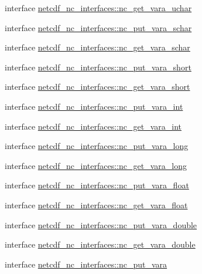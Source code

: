 \begin{DoxyCompactItemize}
\item 
interface \hyperlink{interfacenetcdf__nc__interfaces_1_1nc__get__vara__uchar}{netcdf\+\_\+nc\+\_\+interfaces\+::nc\+\_\+get\+\_\+vara\+\_\+uchar}
\item 
interface \hyperlink{interfacenetcdf__nc__interfaces_1_1nc__put__vara__schar}{netcdf\+\_\+nc\+\_\+interfaces\+::nc\+\_\+put\+\_\+vara\+\_\+schar}
\item 
interface \hyperlink{interfacenetcdf__nc__interfaces_1_1nc__get__vara__schar}{netcdf\+\_\+nc\+\_\+interfaces\+::nc\+\_\+get\+\_\+vara\+\_\+schar}
\item 
interface \hyperlink{interfacenetcdf__nc__interfaces_1_1nc__put__vara__short}{netcdf\+\_\+nc\+\_\+interfaces\+::nc\+\_\+put\+\_\+vara\+\_\+short}
\item 
interface \hyperlink{interfacenetcdf__nc__interfaces_1_1nc__get__vara__short}{netcdf\+\_\+nc\+\_\+interfaces\+::nc\+\_\+get\+\_\+vara\+\_\+short}
\item 
interface \hyperlink{interfacenetcdf__nc__interfaces_1_1nc__put__vara__int}{netcdf\+\_\+nc\+\_\+interfaces\+::nc\+\_\+put\+\_\+vara\+\_\+int}
\item 
interface \hyperlink{interfacenetcdf__nc__interfaces_1_1nc__get__vara__int}{netcdf\+\_\+nc\+\_\+interfaces\+::nc\+\_\+get\+\_\+vara\+\_\+int}
\item 
interface \hyperlink{interfacenetcdf__nc__interfaces_1_1nc__put__vara__long}{netcdf\+\_\+nc\+\_\+interfaces\+::nc\+\_\+put\+\_\+vara\+\_\+long}
\item 
interface \hyperlink{interfacenetcdf__nc__interfaces_1_1nc__get__vara__long}{netcdf\+\_\+nc\+\_\+interfaces\+::nc\+\_\+get\+\_\+vara\+\_\+long}
\item 
interface \hyperlink{interfacenetcdf__nc__interfaces_1_1nc__put__vara__float}{netcdf\+\_\+nc\+\_\+interfaces\+::nc\+\_\+put\+\_\+vara\+\_\+float}
\item 
interface \hyperlink{interfacenetcdf__nc__interfaces_1_1nc__get__vara__float}{netcdf\+\_\+nc\+\_\+interfaces\+::nc\+\_\+get\+\_\+vara\+\_\+float}
\item 
interface \hyperlink{interfacenetcdf__nc__interfaces_1_1nc__put__vara__double}{netcdf\+\_\+nc\+\_\+interfaces\+::nc\+\_\+put\+\_\+vara\+\_\+double}
\item 
interface \hyperlink{interfacenetcdf__nc__interfaces_1_1nc__get__vara__double}{netcdf\+\_\+nc\+\_\+interfaces\+::nc\+\_\+get\+\_\+vara\+\_\+double}
\item 
interface \hyperlink{interfacenetcdf__nc__interfaces_1_1nc__put__vara}{netcdf\+\_\+nc\+\_\+interfaces\+::nc\+\_\+put\+\_\+vara}

\end{DoxyCompactItemize}
